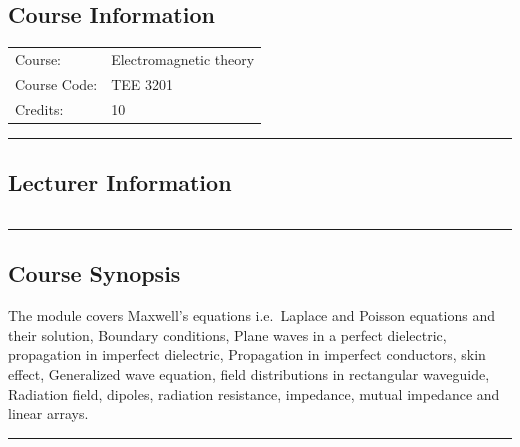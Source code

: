 
\subsection*{Course Information}\label{course:3201}
\vspace{0ex}%
\noindent\parbox{0.5\textwidth}{%
    \noindent\begin{tabular}{@{}ll}
                 \textsf{Course:}          & 	Electromagnetic theory \\
                 \textsf{Course Code:}         & 	TEE 3201    \\
                 \textsf{Credits:}    & 	10
    \end{tabular}}
\vspace{2ex}\hrule\vspace{2ex}

\subsection*{Lecturer Information}
\noindent\parbox{0.5\textwidth}{%
    \noindent\begin{tabular}{@{}ll}
                 
    \end{tabular}}
\vspace{2ex}\hrule\vspace{2ex}


\subsection*{Course Synopsis}
The module covers Maxwell's equations i.e.\ Laplace and Poisson equations and their solution, Boundary conditions, Plane waves in a perfect dielectric, propagation in imperfect dielectric, Propagation in  imperfect conductors, skin effect, Generalized wave equation, field distributions in rectangular waveguide, Radiation field, dipoles, radiation resistance, impedance, mutual impedance and linear arrays.
\vspace{2ex}\hrule\vspace{2ex}

